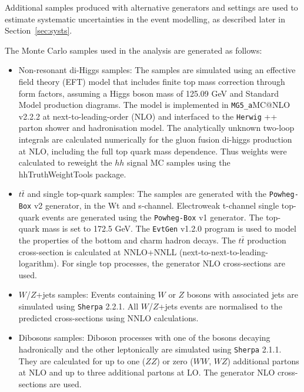 Additional samples produced with alternative generators and settings are used to estimate systematic uncertainties in the event modelling, as described later in Section~\ref{sec:systs}.

 
 
 
 The Monte Carlo samples used in the analysis are generated as follows:


 \begin{itemize}
    \item Non-resonant di-Higgs samples: The samples are simulated using an effective field theory (EFT) model that 
    includes finite top mass correction through form factors, assuming a Higgs boson mass of 125.09 GeV and Standard Model 
    production diagrams. The model is implemented in {\tt MG5\_a}MC@NLO v2.2.2 \cite{Alwall:2014hca} at next-to-leading-order (NLO) and 
    interfaced to the {\tt Herwig} ++ parton shower and hadronisation model\cite{Bahr:2008pv}. The analytically unknown two-loop integrals 
    are calculated numerically for the gluon fusion di-higgs production at NLO, including the full top quark mass dependence. 
    Thus weights were calculated to reweight the $hh$ signal MC samples using the hhTruthWeightTools package\cite{RW}. 
    \item $t\bar{t}$ and single top-quark samples: The samples are generated with the {\tt Powheg-Box} v2 \cite{Alioli:2010xd} generator, 
    in the Wt and s-channel. Electroweak t-channel single top-quark events are generated using the {\tt Powheg-Box} v1 generator. 
    The top-quark mass is set to 172.5 GeV. The {\tt EvtGen} v1.2.0 program \cite{Lange:2001uf} is used to model the properties of 
    the bottom and charm hadron decays. The $t\bar{t}$ production cross-section is calculated at NNLO+NNLL 
    (next-to-next-to-leading-logarithm)\cite{NNLO}. For single top processes, the generator NLO cross-sections are used.
    \item $W$/$Z$+jets samples: Events containing $W$ or $Z$ bosons with associated jets are simulated using {\tt Sherpa} 
    2.2.1\cite{Gleisberg:2008ta}. All $W$/$Z$+jets events are normalised to the predicted cross-sections using NNLO calculations.
    \item Dibosons samples: Diboson processes with one of the bosons decaying hadronically and the other leptonically are 
    simulated using {\tt Sherpa} 2.1.1. They are calculated for up to one ($ZZ$) or zero ($WW$, $WZ$) additional partons at 
    NLO and up to three additional partons at LO. The generator NLO cross-sections are used\cite{mc}.

\end{itemize}
